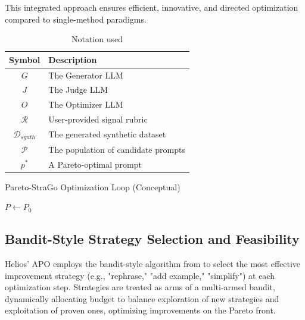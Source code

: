 \documentclass{article}
\begin{document}
This integrated approach ensures efficient, innovative, and directed optimization compared to single-method paradigms.

\begin{table}[h]
  \centering
  \caption{Notation used}
  \label{tab:notation}
  \begin{tabular}{cl}
    \toprule
    \textbf{Symbol}       & \textbf{Description}                \\
    \midrule
    $G$                   & The Generator LLM                   \\
    $J$                   & The Judge LLM                       \\
    $O$                   & The Optimizer LLM                   \\
    $\mathcal{R}$         & User-provided signal rubric         \\
    $\mathcal{D}_{synth}$ & The generated synthetic dataset     \\
    $\mathcal{P}$         & The population of candidate prompts \\
    $p^*$                 & A Pareto-optimal prompt             \\
    \bottomrule
  \end{tabular}
\end{table}

\begin{algorithm}[H]
  \caption{Pareto-StraGo Optimization Loop (Conceptual)}
  \label{alg:paretostrago}
  \SetAlgoLined
  $P \leftarrow P_0$\;
\end{algorithm}

\subsection{Bandit-Style Strategy Selection and Feasibility}
Helios' APO employs the bandit-style algorithm from \cite{ashizawa2025banditbasedpromptdesignstrategy} to select the most effective improvement strategy (e.g., "rephrase," "add example," "simplify") at each optimization step. Strategies are treated as arms of a multi-armed bandit, dynamically allocating budget to balance exploration of new strategies and exploitation of proven ones, optimizing improvements on the Pareto front.
\end{document}
